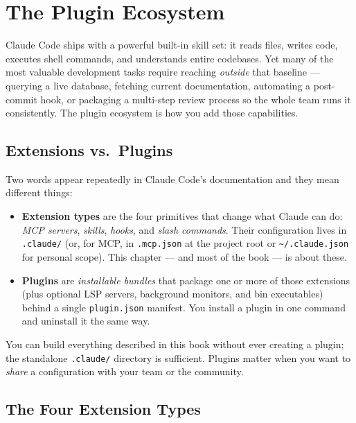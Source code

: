 \chapter{The Plugin Ecosystem}
\label{ch:plugin-ecosystem}

Claude Code ships with a powerful built-in skill set: it reads files, writes
code, executes shell commands, and understands entire codebases. Yet many of
the most valuable development tasks require reaching \emph{outside} that
baseline — querying a live database, fetching current documentation, automating
a post-commit hook, or packaging a multi-step review process so the whole team
runs it consistently. The plugin ecosystem is how you add those capabilities.


\section{Extensions vs.\ Plugins}
\label{sec:extensions-vs-plugins}

Two words appear repeatedly in Claude Code's documentation and they mean
different things:

\begin{itemize}
  \item \textbf{Extension types} are the four primitives that change what
        Claude can do: \emph{MCP servers}, \emph{skills}, \emph{hooks}, and
        \emph{slash commands}. Their configuration lives in
        \texttt{.claude/} (or, for MCP, in \texttt{.mcp.json} at the
        project root or \texttt{\textasciitilde/.claude.json} for personal
        scope). This chapter — and most of the book — is about these.
  \item \textbf{Plugins} are \emph{installable bundles} that package one or
        more of those extensions (plus optional LSP servers, background
        monitors, and bin executables) behind a single
        \texttt{plugin.json} manifest. You install a plugin in one
        command and uninstall it the same way.
\end{itemize}

You can build everything described in this book without ever creating a
plugin; the standalone \texttt{.claude/} directory is sufficient. Plugins
matter when you want to \emph{share} a configuration with your team or the
community.

\section{The Four Extension Types}
\label{sec:four-types}

